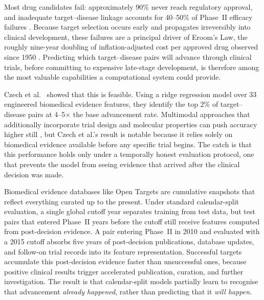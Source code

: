 \documentclass[a4,center]{NAR}
\begin{document}
{Most drug candidates fail: approximately 90\% never reach regulatory
approval, and inadequate target--disease linkage accounts for 40--50\% of
Phase~II efficacy failures \citep{Sun2022WhyIt, Arrowsmith2013Trial2011-2012}. Because
target selection occurs early and propagates irreversibly into clinical
development, these failures are a principal driver of Eroom's Law, the
roughly nine-year doubling of inflation-adjusted cost per approved drug
observed since 1950 \citep{Scannell2012DiagnosingEfficiency}. Predicting which
target--disease pairs will advance through clinical trials, before
committing to expensive late-stage development, is therefore among the
most valuable capabilities a computational system could provide.

Czech et al.\ \citep{Czech2024CLINICALFORECASTING} showed that this is feasible. Using a
ridge regression model over 33 engineered biomedical evidence features,
they identify the top 2\% of target--disease pairs at 4--5$\times$ the
base advancement rate. Multimodal approaches that additionally incorporate
trial design and molecular properties can push accuracy higher still
\citep{Aliper2023PredictionIntelligence}, but Czech et al.'s result is notable because it
relies solely on biomedical evidence available before any specific trial
begins. The catch is that this performance holds only under a temporally
honest evaluation protocol, one that prevents the model from seeing
evidence that arrived after the clinical decision was made.

Biomedical evidence databases like Open Targets are cumulative snapshots
that reflect everything curated up to the present. Under standard
calendar-split evaluation, a single global cutoff year separates training
from test data, but test pairs that entered Phase~II years before the
cutoff still receive features computed from post-decision evidence. A
pair entering Phase~II in 2010 and evaluated with a 2015 cutoff absorbs
five years of post-decision publications, database updates, and
follow-on trial records into its feature representation. Successful
targets accumulate this post-decision evidence faster than unsuccessful
ones, because positive clinical results trigger accelerated publication,
curation, and further investigation. The result is that calendar-split
models partially learn to recognise that advancement \emph{already
happened}, rather than predicting that it \emph{will happen}.

}
\end{document}
